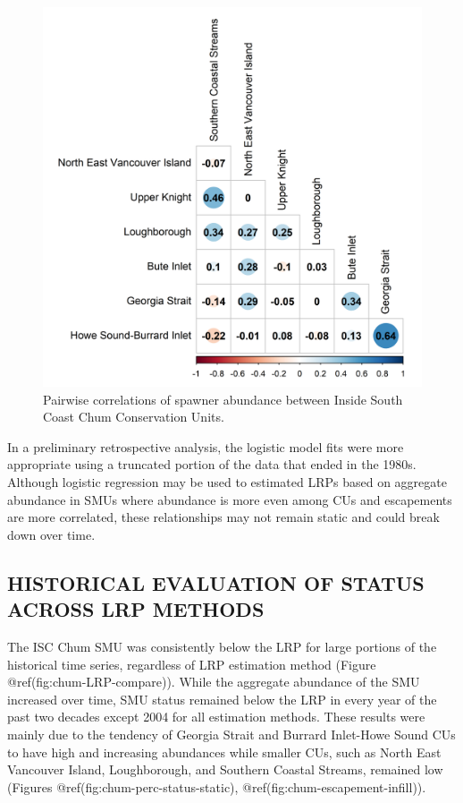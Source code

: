 \documentclass[
]{article}
\begin{document}
\begin{figure}

{\centering \includegraphics[width=0.8\linewidth]{figure/chum-spawners-corr} 

}

\caption{Pairwise correlations of spawner abundance between Inside South Coast Chum Conservation Units.}\label{fig:chum-spawner-corr}
\end{figure}
\linebreak

In a preliminary retrospective analysis, the logistic model fits were
more appropriate using a truncated portion of the data that ended in the
1980s. Although logistic regression may be used to estimated LRPs based
on aggregate abundance in SMUs where abundance is more even among CUs
and escapements are more correlated, these relationships may not remain
static and could break down over time.

\hypertarget{historical-evaluation-of-status-across-lrp-methods}{%
\subsection{HISTORICAL EVALUATION OF STATUS ACROSS LRP
METHODS}\label{historical-evaluation-of-status-across-lrp-methods}}

The ISC Chum SMU was consistently below the LRP for large portions of
the historical time series, regardless of LRP estimation method (Figure
@ref(fig:chum-LRP-compare)). While the aggregate abundance of the SMU
increased over time, SMU status remained below the LRP in every year of
the past two decades except 2004 for all estimation methods. These
results were mainly due to the tendency of Georgia Strait and Burrard
Inlet-Howe Sound CUs to have high and increasing abundances while
smaller CUs, such as North East Vancouver Island, Loughborough, and
Southern Coastal Streams, remained low (Figures
@ref(fig:chum-perc-status-static), @ref(fig:chum-escapement-infill)).
\end{document}
